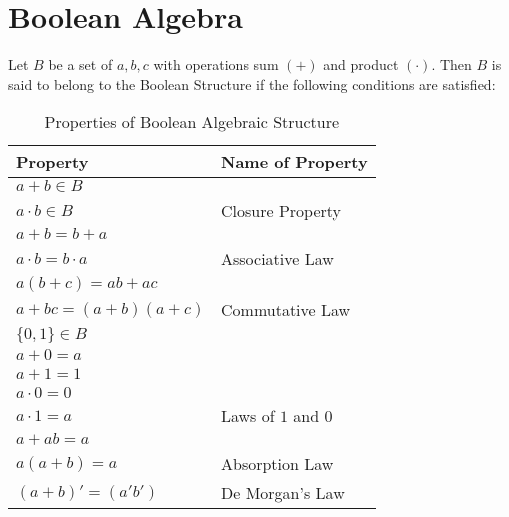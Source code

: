 \large{\chapter{Boolean Algebra}}
Let $B$ be a set of $a,b,c$ with operations sum $(+)$ and product $(\cdot)$.\newline
Then $B$ is said to belong to the Boolean Structure if the following conditions are satisfied:
\begin{table}[htbp]
	\centering
	\begin{tabular}{l l}
		\toprule
		Property & Name of Property\\
		\midrule
		$a+b \in B$ & \\
		$a \cdot b \in B$ & Closure Property\\

		\midrule[0.05pt]
		$a+b=b+a$ &\\
		$a \cdot b= b \cdot a$ & Associative Law\\

		\midrule[0.05pt]
		$a(b+c) = ab + ac $ & \\
		$a+bc=(a+b)(a+c)$ & Commutative Law\\

		\midrule[0.05pt]
		$\lbrace 0,1 \rbrace \in B$ & \\
		$a+0=a$ & \\
		$a+1=1$ & \\
		$a \cdot 0=0$ & \\
		$a \cdot 1=a$ & Laws of $1$ and $0$\\

		\midrule[0.05pt]
		$a+ab=a$ & \\
		$a(a+b)=a$ & Absorption Law\\

		\midrule[0.1pt]
		$(a+b)'=(a'b')$ & De Morgan's Law\\
		\bottomrule
	\end{tabular}
	\caption{Properties of Boolean Algebraic Structure}
	\label{boolean}
\end{table}


